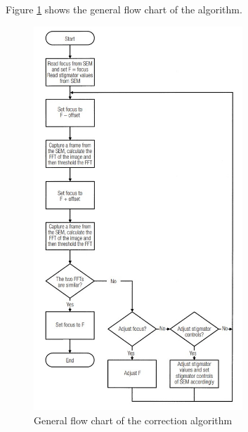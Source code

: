 \documentclass{article}
\begin{document}
Figure \ref{Correction algorithm flowchart} shows the general flow chart of the algorithm.

\begin{figure}
    \centering
    \includegraphics[width=0.7\textwidth]{Images/Correction algorithm flowchart.jpg}
    \caption{General flow chart of the correction algorithm \cite{SEM astigmatation correction algorithm}}
    \label{Correction algorithm flowchart}
\end{figure}
\end{document}
